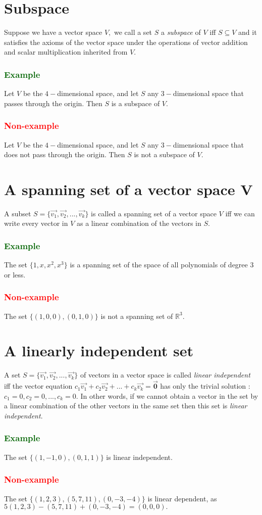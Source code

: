 \documentclass[a4paper,12pt]{article}
\begin{document}
\section{Subspace}
Suppose we have a vector space $V,$ we call a set $S$ a \textit{subspace} of $V$ iff $S \subseteq V$ and it satisfies the axioms of the vector space under the operations of vector addition and scalar multiplication inherited from $V$.
    \subsubsection*{\textcolor{darkgreen}{Example}}
    Let $V$ be the $4-$dimensional space, and let $S$ any $3-$dimensional space that passes through the origin. Then $S$ is a subspace of $V$.
    \subsubsection*{\textcolor{red}{Non-example}}
    Let $V$ be the $4-$dimensional space, and let $S$ any $3-$dimensional space that does not pass through the origin. Then $S$ is not a subspace of $V$.
\section{A spanning set of a vector space V}
A subset $S=\{\vec{v_1},\vec{v_2},...,\vec{v_k}\}$ is called a spanning set of a vector space $V$ iff we can write every vector in $V$ as a linear combination of the vectors in $S.$
\begin{multicols}{2}
    \subsubsection*{\textcolor{darkgreen}{Example}}
    The set $\{1,x,x^2,x^3\}$ is a spanning set of the space of all polynomials of degree $3$ or less.
    \subsubsection*{\textcolor{red}{Non-example}}
    The set $\{(1,0,0), (0,1,0)\}$ is not a spanning set of $\mathbb{R}^3.$
\end{multicols}
\section{A linearly independent set}
A set $S=\{\vec{v_1},\vec{v_2},...,\vec{v_k}\}$ of vectors in a vector space is called \textit{linear independent} iff the vector equation $c_1\vec{v_1}+c_2\vec{v_2}+...+c_k\vec{v_k}=\vec{\textbf{0}}$ has only the trivial solution : $c_1=0,c_2=0,...,c_k=0.$ In other words, if we cannot obtain a vector in the set by a linear combination of the other vectors in the same set then this set is \textit{linear independent}.
    \subsubsection*{\textcolor{darkgreen}{Example}}
    The set $\{(1,-1,0), (0,1,1)\}$ is linear independent.
    \subsubsection*{\textcolor{red}{Non-example}}
    The set $\{(1,2,3),(5,7,11),(0,-3,-4)\}$ is linear dependent, as $5(1,2,3)-(5,7,11)+(0,-3,-4)=(0,0,0).$
\end{document}
